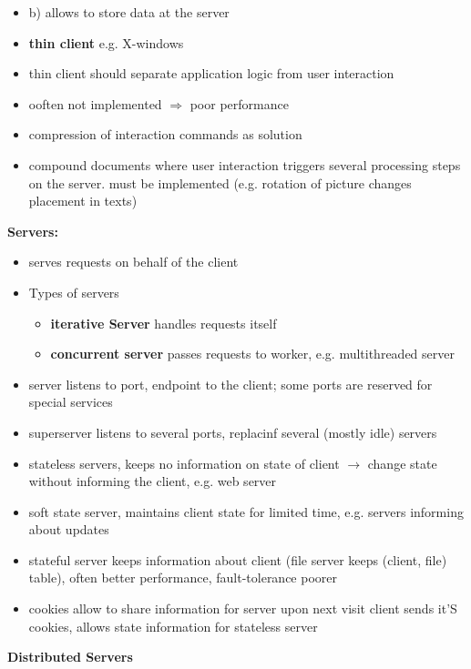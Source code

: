\documentclass[ngerman,a4paper]{report}
\begin{document}
\begin{itemize}
\item b) allows to store data at the server
\item \textbf{thin client} e.g. X-windows
\item thin client should separate application logic from user interaction
\item ooften not implemented $\Rightarrow$ poor performance
\item compression of interaction commands as solution
\item compound documents where user interaction triggers several processing steps on the server. must be implemented (e.g. rotation of picture changes placement in texts)
\end{itemize}

\textbf{Servers:}\\
\begin{itemize}
	\item serves requests on behalf of the client
	\item Types of servers\\
		\begin{itemize}
			\item \textbf{iterative Server} handles requests itself
			\item \textbf{concurrent server} passes requests to worker, e.g. multithreaded server
		\end{itemize}
	\item server listens to port, endpoint to the client; some ports are reserved for special services
	\item superserver listens to several ports, replacinf several (mostly idle) servers
	\item stateless servers, keeps no information on state of client $\rightarrow$ change state without informing the client, e.g. web server
	\item soft state server, maintains client state for limited time, e.g. servers informing about updates
	\item stateful server keeps information about client (file server keeps (client, file) table), often better performance, fault-tolerance poorer
	\item cookies allow to share information for server upon next visit client sends it'S cookies, allows state information for stateless server

\end{itemize}
\textbf{Distributed Servers}\\
\end{document}
